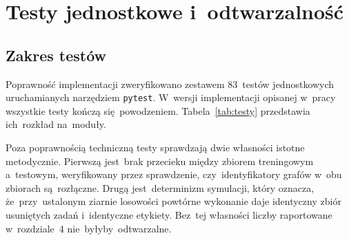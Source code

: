 \section{Testy jednostkowe i~odtwarzalność}
\label{sec:testy}

\subsection{Zakres testów}

Poprawność implementacji zweryfikowano zestawem 83~testów jednostkowych
uruchamianych narzędziem \texttt{pytest}. W~wersji implementacji
opisanej w~pracy wszystkie testy kończą się~powodzeniem.
Tabela~\ref{tab:testy} przedstawia ich~rozkład na~moduły.

Poza poprawnością techniczną testy sprawdzają dwie własności istotne
metodycznie. Pierwszą jest~brak przecieku między zbiorem treningowym
a~testowym, weryfikowany przez sprawdzenie, czy~identyfikatory grafów w~obu
zbiorach są~rozłączne. Drugą jest~determinizm symulacji, który oznacza,
że~przy~ustalonym ziarnie losowości powtórne wykonanie daje identyczny zbiór
usuniętych zadań i~identyczne etykiety. Bez~tej własności liczby raportowane
w~rozdziale~4 nie~byłyby~odtwarzalne.

